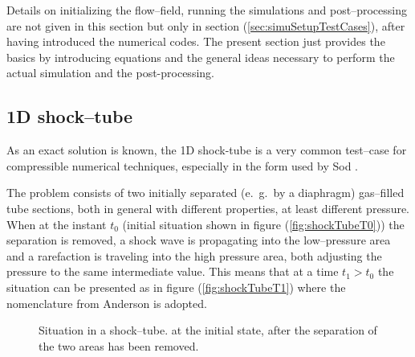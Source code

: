 \documentclass[11pt,a4paper,twoside]{report}
\begin{document}
Details on initializing the flow--field, running the simulations and post--processing are not given in this section but only in section (\ref{sec:simuSetupTestCases}), after having introduced the numerical codes. The present section just provides the basics by introducing equations and the general ideas necessary to perform the actual simulation and the post-processing.

\subsection{1D shock--tube}
\label{sec:TestCases_1DshockTube}
As an exact solution is known, the 1D shock-tube is a very common test--case for compressible numerical techniques, especially in the form used by Sod \cite{Sod1978}.

 The problem consists of two initially separated (e.\ g.\ by a diaphragm) gas--filled tube sections, both in general with different properties, at least different pressure. When at the instant $t_0$ (initial situation shown in figure (\ref{fig:shockTubeT0})) the separation is removed, a shock wave is propagating into the low--pressure area and a rarefaction is traveling into the high pressure area, both adjusting the pressure to the same intermediate value. This means that at a time $t_1>t_0$ the situation can be presented as in figure (\ref{fig:shockTubeT1}) where the nomenclature from Anderson \cite{Anderson2002} is adopted.

\begin{figure}[h]
    \centering
\label{fig:shockTube}
\caption[Schematic of a shock--tube problem]{Situation in a shock--tube.  at the initial state,  after the separation of the two areas has been removed.}
\end{figure}

%             
%       
\end{document}
